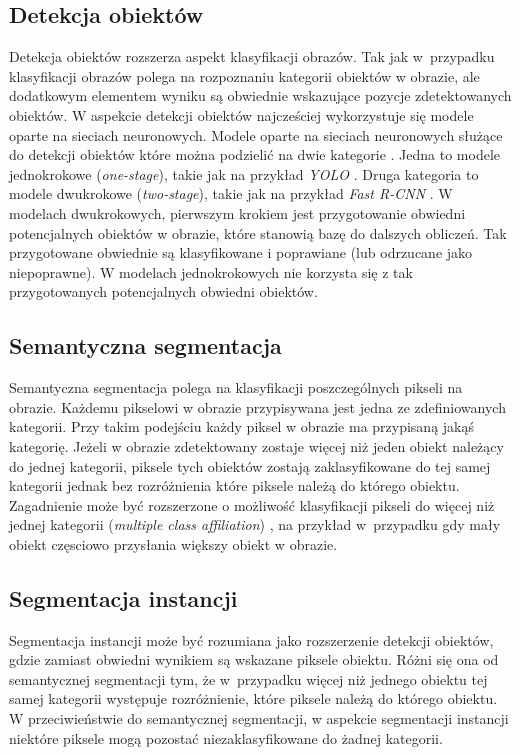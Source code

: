 \subsection*{Detekcja obiektów}
Detekcja obiektów rozszerza aspekt klasyfikacji obrazów. Tak jak w~przypadku klasyfikacji obrazów polega na rozpoznaniu kategorii obiektów w obrazie, ale dodatkowym elementem wyniku są obwiednie wskazujące pozycje zdetektowanych obiektów. W aspekcie detekcji obiektów najcześciej wykorzystuje się modele oparte na sieciach neuronowych. Modele oparte na sieciach neuronowych służące do detekcji obiektów które można podzielić na dwie kategorie \cite{survey-deep-learning-object-dection}. Jedna to modele jednokrokowe (\textit{one-stage}), takie jak na przykład \textit{YOLO} \cite{yolo}. Druga kategoria to modele dwukrokowe (\textit{two-stage}), takie jak na przykład \textit{Fast R-CNN} \cite{fast-rcnn}. W modelach dwukrokowych, pierwszym krokiem jest przygotowanie obwiedni potencjalnych obiektów w obrazie, które stanowią bazę do dalszych obliczeń. Tak przygotowane obwiednie są klasyfikowane i poprawiane (lub odrzucane jako niepoprawne). W modelach jednokrokowych nie korzysta się z tak przygotowanych potencjalnych obwiedni obiektów.

\subsection*{Semantyczna segmentacja}
Semantyczna segmentacja polega na klasyfikacji poszczególnych pikseli na obrazie. Każdemu pikselowi w obrazie przypisywana jest jedna ze zdefiniowanych kategorii. Przy takim podejściu każdy piksel w obrazie ma przypisaną jakąś kategorię. Jeżeli w obrazie zdetektowany zostaje więcej niż jeden obiekt należący do jednej kategorii, piksele tych obiektów zostają zaklasyfikowane do tej samej kategorii jednak bez rozróżnienia które piksele należą do którego obiektu.
Zagadnienie może być rozszerzone o możliwość klasyfikacji pikseli do więcej niż jednej kategorii (\textit{multiple class affiliation}) \cite{survey-semantic-segmentation}, na przykład w~przypadku gdy mały obiekt częsciowo przysłania większy obiekt w obrazie.

\subsection*{Segmentacja instancji}
Segmentacja instancji może być rozumiana jako rozszerzenie detekcji obiektów, gdzie zamiast obwiedni wynikiem są wskazane piksele obiektu. Różni się ona od semantycznej segmentacji tym, że w~przypadku więcej niż jednego obiektu tej samej kategorii występuje rozróżnienie, które piksele należą do którego obiektu. W przeciwieństwie do semantycznej segmentacji, w aspekcie segmentacji instancji niektóre piksele mogą pozostać niezaklasyfikowane do żadnej kategorii.

